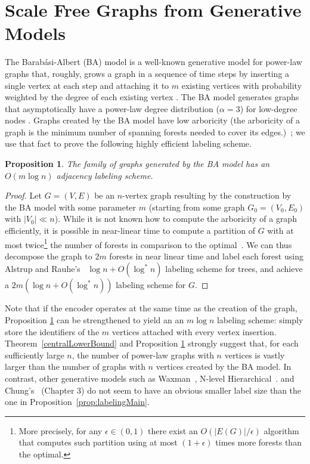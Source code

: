 \documentclass{article}
\newtheorem{proposition}{Proposition}
\theoremstyle{remark}
\begin{document}
\section{Scale Free  Graphs from Generative Models}\label{Sec:ScaleFree}
The Barab{\'a}si-Albert (BA) model is a well-known generative model for power-law graphs that, roughly, grows a graph in a sequence of time steps by
inserting a single vertex at each step and attaching it to $m$ existing vertices with probability weighted by the degree of each existing vertex \cite{barabasi1999emergence}. The BA model
generates graphs that asymptotically have a power-law degree distribution ($\alpha = 3$) for low-degree nodes \cite{DBLP:journals/rsa/BollobasRST01}.
Graphs created by the BA model have low arboricity (the arboricity of a graph is the minimum number of spanning forests needed to cover its edges.)~\cite{goel2006bounded}; we use
that fact to prove the following highly efficient labeling scheme. 




\begin{proposition}\label{Th:baLabeling}
The family of graphs generated by the BA model has an $O(m \log n)$ adjacency labeling scheme.
\end{proposition}

\begin{proof}
Let  $G=(V,E)$  be an $n$-vertex graph resulting by the construction  by the BA model with some parameter $m$ (starting from some graph $G_0 = (V_0,E_0)$ with $\vert V_0 \vert \ll n$).
While it is not known how to compute the   arboricity of a graph efficiently, it is possible in near-linear time to compute a partition of $G$ with  at most twice\footnote{More precisely, for any $\epsilon \in (0,1)$  there exist an $O(|E(G)| / \epsilon)$ algorithm~\cite{kowalik2006approximation} that computes such partition using at most $(1+ \epsilon)$ times more forests than the optimal.} the number of forests in comparison to the optimal~\cite{arikati1997efficient}.
We can thus decompose the graph to $2m$ forests in near linear time and label each forest using Alstrup and Rauhe's~\cite{Alstrup02} $\log n + O(\log^* n)$ labeling scheme for trees,  and achieve a $2m (\log n + O(\log^* n))$ labeling scheme for $G$.
\end{proof}

Note that if the encoder operates at the same time as the creation of the graph, Proposition \ref{Th:baLabeling} can be strengthened to yield an an $m \log n$ labeling scheme: simply store the  
 identifiers of the $m$ vertices attached with every vertex insertion.
Theorem~\ref{centralLowerBound} and Proposition \ref{Th:baLabeling} strongly suggest that, for each sufficiently large $n$, the number of  power-law graphs with $n$ vertices  is vastly larger than the number of graphs with $n$ vertices created by the  BA model.  In contrast, other generative models such as   Waxman~\cite{waxman1988routing}, N-level Hierarchical~\cite{calvert1997modeling}.
and Chung's~\cite{chung2006complex} (Chapter 3)  do not seem to have an obvious smaller label size than the one in Proposition~\ref{prop:labelingMain}.
\end{document}
